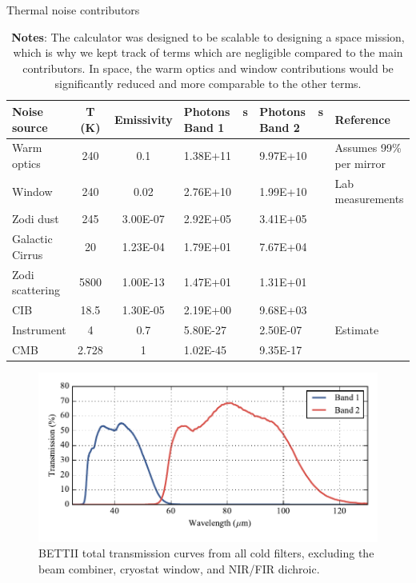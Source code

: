 \renewcommand{\arraystretch}{1.5}
\begin{table}
\small
\caption{Thermal noise contributors}
\label{tab:noiseparams}
\vspace{-0.5cm}
\begin{longtable}{P{2.5cm}ccP{2cm}P{2cm}p{3cm}}
\toprule
Noise source	&		T (K)		&		Emissivity		&		Photons~\si{\per\second} Band 1		&		Photons~\si{\per\second} Band 2		&	Reference	 \\
\midrule
Warm optics	&	\num{	240	}	&	\num{	0.1	}	&	\num{	1.38E+11	}	&	\num{	9.97E+10	}	&	Assumes 99\% per mirror	\\
Window	&	\num{	240	}	&	\num{	0.02	}	&	\num{	2.76E+10	}	&	\num{	1.99E+10	}	&	Lab measurements	\\
Zodi dust	&	\num{	245	}	&	\num{	3.00E-07	}	&	\num{	2.92E+05	}	&	\num{	3.41E+05	}	&	\cite{Fixsen:2002da}	\\
Galactic Cirrus	&	\num{	20	}	&	\num{	1.23E-04	}	&	\num{	1.79E+01	}	&	\num{	7.67E+04	}	&	\cite{Bracco:2011gw}	\\
Zodi scattering	&	\num{	5800	}	&	\num{	1.00E-13	}	&	\num{	1.47E+01	}	&	\num{	1.31E+01	}	&	\cite{Fixsen:2002da}	\\
CIB	&	\num{	18.5	}	&	\num{	1.30E-05	}	&	\num{	2.19E+00	}	&	\num{	9.68E+03	}	&	\cite{Fixsen:1998br}	\\
Instrument	&	\num{	4	}	&	\num{	0.7	}	&	\num{	5.80E-27	}	&	\num{	2.50E-07	}	&	Estimate	\\
CMB	&	\num{	2.728	}	&	\num{	1	}	&	\num{	1.02E-45	}	&	\num{	9.35E-17	}	&	\cite{Fixsen:1996di}	\\
\bottomrule
\end{longtable}
\caption*{\textbf{Notes}: The calculator was designed to be scalable to designing a space mission, which is why we kept track of terms which are negligible compared to the main contributors. In space, the warm optics and window contributions would be significantly reduced and more comparable to the other terms.}
\end{table}

\begin{figure}[!h]
	\centering
	\includegraphics[width=\textwidth]{Figures/BETTII_transmission.pdf}
	\vspace{-0.5cm}
	\caption[BETTII Transmission curves]{BETTII total transmission curves from all cold filters, excluding the beam combiner, cryostat window, and NIR/FIR dichroic.}
	\label{fig:BETTIITransmission}
    \end{figure}



